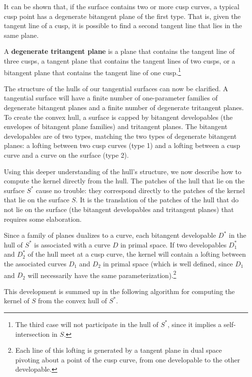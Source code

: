 \documentclass[doublespacing]{elsart}
\begin{document}
It can be shown that, if the surface contains two or more cusp curves,
a typical cusp point has a degenerate bitangent plane of the first type.
That is, given the tangent line of a cusp, 
it is possible to find a second tangent line that lies in the same plane.

\begin{defn2}
A {\bf degenerate tritangent plane} is 
a plane that contains the tangent line of three cusps, 
a tangent plane that contains the tangent lines of two cusps,
or a bitangent plane that contains the tangent line of one cusp.\footnote{The
	third case will not participate in the hull of $S^*$, since
	it implies a self-intersection in $S$.}
\end{defn2}

The structure of the hulls of our tangential surfaces can now be clarified.
A tangential surface will have a finite number of one-parameter families of degenerate bitangent planes
and a finite number of degenerate tritangent planes.
To create the convex hull, a surface is capped by bitangent developables
(the envelopes of bitangent plane families) and tritangent planes.
The bitangent developables
are of two types, matching the two types of degenerate bitangent planes: 
a lofting between two cusp curves (type 1) and
a lofting between a cusp curve and a curve on the surface (type 2).

Using this deeper understanding of the hull's structure,
we now describe how to compute the kernel directly from the hull.
The patches of the hull that lie on the surface $S^*$
cause no trouble: they correspond directly
to the patches of the kernel that lie on the surface $S$.
It is the translation of the patches of the hull that do not lie on the surface 
(the bitangent developables and tritangent planes)
that requires some elaboration.

Since a family of planes dualizes to a curve,
each bitangent developable $D^*$ in the hull of $S^*$ 
is associated with a curve $D$ in primal space.
If two developables $D_1^*$ and $D_2^*$ of the hull meet at a cusp curve, 
the kernel will contain a lofting between the associated curves 
$D_1$ and $D_2$ in primal space 
(which is well defined, since $D_1$ and $D_2$ 
will necessarily have the same parameterization).\footnote{Each line 
	of this lofting is generated by a tangent plane in dual space pivoting 
	about a point of the cusp curve,
	from one developable to the other developable.}

This development is summed up in the following algorithm for computing the kernel of $S$ 
from the convex hull of $S^*$.
\end{document}

